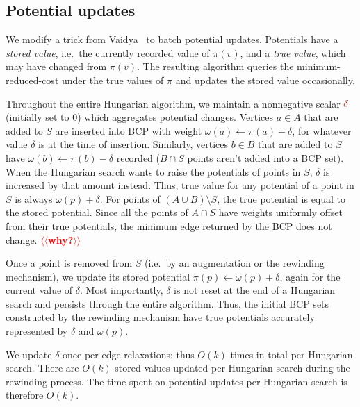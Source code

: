 \documentclass[a4paper,UKenglish]{socg-lipics-v2018}
\makeatletter
\theoremstyle{plain}
\numberwithin{figure}{section}
\def\EMPH#1{\textcolor{BrickRed}{{\emph{#1}}}}
\def\n@te#1{\textsf{\boldmath \textbf{$\langle\!\langle$#1$\rangle\!\rangle$}}\leavevmode}
\def\note#1{\textcolor{red}{\n@te{#1}}}
\makeatother
\begin{document}
\begin{toappendix}
\subsection{Potential updates}
\label{SSA:potential-update}

We modify a trick from Vaidya~\cite{Vaidya89} to batch potential updates.
Potentials have a \EMPH{stored value}, i.e.\ the currently recorded value of
$\pi(v)$, and a \EMPH{true value}, which may have changed from $\pi(v)$.
The resulting algorithm queries the minimum-reduced-cost under the true values
of $\pi$ and updates the stored value occasionally.

Throughout the entire Hungarian algorithm, we maintain a nonnegative scalar
$\EMPH{$\delta$}$ (initially set to $0$) which aggregates potential changes.
Vertices $a \in A$ that are added to $S$ are inserted into BCP with weight
$\omega(a) \gets \pi(a) - \delta$, for whatever value $\delta$ is at the time
of insertion.
Similarly, vertices $b \in B$ that are added to $S$ have $\omega(b) \gets \pi(b) - \delta$
recorded ($B \cap S$ points aren't added into a BCP set).
When the Hungarian search wants to raise the potentials of points in $S$,
$\delta$ is increased by that amount instead.
Thus, true value for any potential of a point in $S$ is always $\omega(p) + \delta$.
For points of $(A \cup B) \setminus S$, the true potential is equal to the
stored potential.
Since all the points of $A \cap S$ have weights uniformly offset from their
true potentials, the minimum edge returned by the BCP does not change. \note{why?}

Once a point is removed from $S$ (i.e.\ by an augmentation or the rewinding
mechanism), we update its stored potential $\pi(p) \gets \omega(p) + \delta$,
again for the current value of $\delta$.
Most importantly, $\delta$ is not reset at the end of a Hungarian search and
persists through the entire algorithm.
Thus, the initial BCP sets constructed by the rewinding mechanism have true
potentials accurately represented by $\delta$ and $\omega(p)$.

We update $\delta$ once per edge relaxations; thus $O(k)$ times in total per Hungarian search.
There are $O(k)$ stored values updated per Hungarian search during the rewinding process.
The time spent on potential updates per Hungarian search is therefore $O(k)$.
\end{toappendix}


\end{document}
